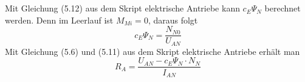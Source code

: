 \chapter{}\label{ex:aufg3}
%
\section{}\label{sec:aufg3a}
Mit Gleichung (5.12) aus dem Skript elektrische Antriebe kann $c_E \Psi_N$ berechnet werden. Denn im Leerlauf ist $M_{Mi} = 0$, daraus folgt
\begin{equation}
c_E \Psi_N = \frac{N_{N0}}{U_{AN}}
\end{equation} 
Mit Gleichung (5.6) und (5.11) aus dem Skript elektrische Antriebe erhält man
\begin{equation}
R_A = \frac{U_{AN} - c_E \Psi_N \cdot N_N}{I_{AN}}
\end{equation} 

\section{}\label{sec:aufg3b}
%
\clearpage